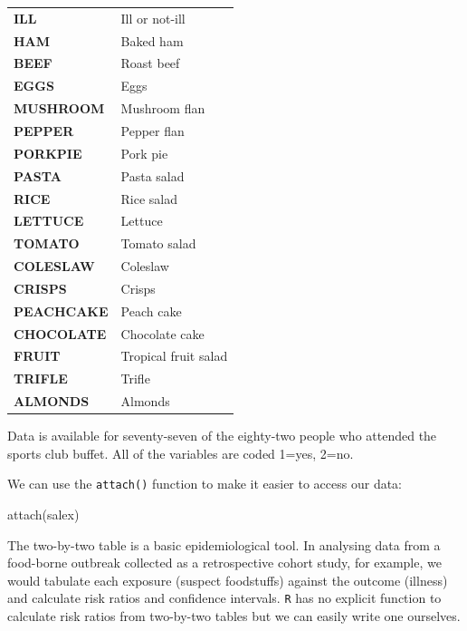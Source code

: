 \documentclass[
  12pt,
]{book}
\newenvironment{Shaded}{\begin{snugshade}}{\end{snugshade}}
\newcommand{\FunctionTok}[1]{\textcolor[rgb]{0.00,0.00,0.00}{#1}}
\newcommand{\NormalTok}[1]{#1}
\begin{document}
\begin{longtable}[]{@{}
  >{\raggedright\arraybackslash}p{}
  >{\raggedright\arraybackslash}p{}@{}}
\toprule()
\endhead
\textbf{ILL} & Ill or not-ill \\
\textbf{HAM} & Baked ham \\
\textbf{BEEF} & Roast beef \\
\textbf{EGGS} & Eggs \\
\textbf{MUSHROOM} & Mushroom flan \\
\textbf{PEPPER} & Pepper flan \\
\textbf{PORKPIE} & Pork pie \\
\textbf{PASTA} & Pasta salad \\
\textbf{RICE} & Rice salad \\
\textbf{LETTUCE} & Lettuce \\
\textbf{TOMATO} & Tomato salad \\
\textbf{COLESLAW} & Coleslaw \\
\textbf{CRISPS} & Crisps \\
\textbf{PEACHCAKE} & Peach cake \\
\textbf{CHOCOLATE} & Chocolate cake \\
\textbf{FRUIT} & Tropical fruit salad \\
\textbf{TRIFLE} & Trifle \\
\textbf{ALMONDS} & Almonds \\
\bottomrule()
\end{longtable}

Data is available for seventy-seven of the eighty-two people who attended the sports club buffet. All of the variables are coded 1=yes, 2=no.

\newpage

We can use the \texttt{attach()} function to make it easier to access our data:

\begin{Shaded}
\begin{Highlighting}[]
\FunctionTok{attach}\NormalTok{(salex)}
\end{Highlighting}
\end{Shaded}

The two-by-two table is a basic epidemiological tool. In analysing data from a food-borne outbreak collected as a retrospective cohort study, for example, we would tabulate each exposure (suspect foodstuffs) against the outcome (illness) and calculate risk ratios and confidence intervals. \texttt{R} has no explicit function to calculate risk ratios from two-by-two tables but we can easily write one ourselves.
\end{document}
